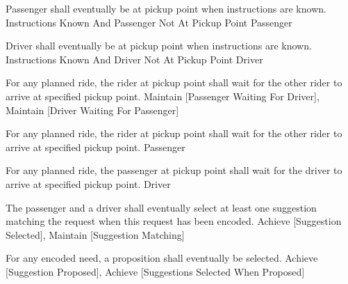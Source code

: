   \startkaosspec
  	 {Passenger shall eventually be at pickup point when instructions are known.}
  	 {Instructions Known And Passenger Not At Pickup Point}
  	 {Passenger}
  \stopkaosspec

  \startkaosspec
  	 {Driver shall eventually be at pickup point when instructions are known.}
  	 {Instructions Known And Driver Not At Pickup Point}
  	 {Driver}
  \stopkaosspec

  \startkaosspec
  	 {For any planned ride, the rider at pickup point shall wait for the other rider to arrive at specified pickup point.}
  	 {Maintain [Passenger Waiting For Driver], Maintain [Driver Waiting For Passenger]}
  \stopkaosspec

  \startkaosspec
  	 {For any planned ride, the rider at pickup point shall wait for the other rider to arrive at specified pickup point.}
  	 {Passenger}
  \stopkaosspec

  \startkaosspec
  	 {For any planned ride, the passenger at pickup point shall wait for the driver to arrive at specified pickup point.}
  	 {Driver}
  \stopkaosspec


    {}

  \startkaosspec
  	 {The passenger and a driver shall eventually select at least one suggestion matching the request when this request has been encoded.}
  	 {Achieve [Suggestion Selected], Maintain [Suggestion Matching]}
  \stopkaosspec

  \startkaosspec
  	 {For any encoded need, a proposition shall eventually be selected.}
  	 {Achieve [Suggestion Proposed], Achieve [Suggestions Selected When Proposed]}
  \stopkaosspec

